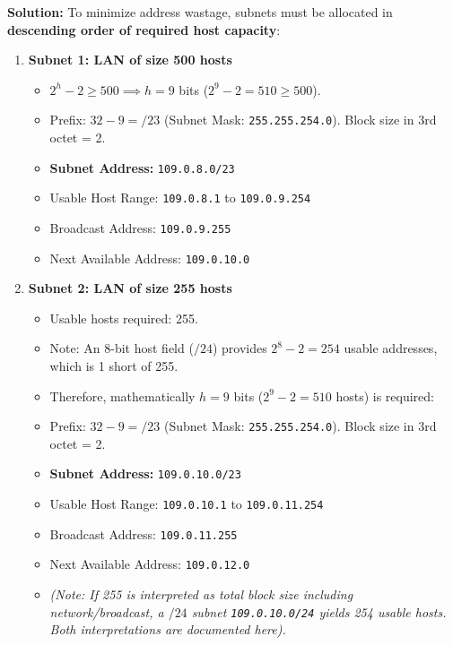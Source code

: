 \documentclass[11pt,a4paper]{article}
\begin{document}
\textbf{Solution:}
To minimize address wastage, subnets must be allocated in \textbf{descending order of required host capacity}:

\begin{enumerate}
    \item \textbf{Subnet 1: LAN of size 500 hosts}
    \begin{itemize}
        \item $2^h - 2 \ge 500 \implies h = 9$ bits ($2^9 - 2 = 510 \ge 500$).
        \item Prefix: $32 - 9 = /23$ (Subnet Mask: \texttt{255.255.254.0}). Block size in 3rd octet = 2.
        \item \textbf{Subnet Address:} \texttt{109.0.8.0/23}
        \item Usable Host Range: \texttt{109.0.8.1} to \texttt{109.0.9.254}
        \item Broadcast Address: \texttt{109.0.9.255}
        \item Next Available Address: \texttt{109.0.10.0}
    \end{itemize}

    \item \textbf{Subnet 2: LAN of size 255 hosts}
    \begin{itemize}
        \item Usable hosts required: 255.
        \item Note: An 8-bit host field ($/24$) provides $2^8 - 2 = 254$ usable addresses, which is 1 short of 255.
        \item Therefore, mathematically $h = 9$ bits ($2^9 - 2 = 510$ hosts) is required:
        \item Prefix: $32 - 9 = /23$ (Subnet Mask: \texttt{255.255.254.0}). Block size in 3rd octet = 2.
        \item \textbf{Subnet Address:} \texttt{109.0.10.0/23}
        \item Usable Host Range: \texttt{109.0.10.1} to \texttt{109.0.11.254}
        \item Broadcast Address: \texttt{109.0.11.255}
        \item Next Available Address: \texttt{109.0.12.0}
        \item \textit{(Note: If 255 is interpreted as total block size including network/broadcast, a $/24$ subnet \texttt{109.0.10.0/24} yields 254 usable hosts. Both interpretations are documented here).}
    \end{itemize}


\end{enumerate}
\end{document}
